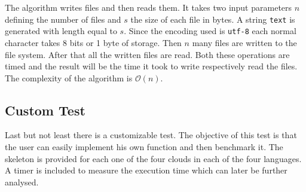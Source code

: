 The algorithm writes files and then reads them. It takes two input parameters $n$ defining the number of files and $s$ the size of each file in bytes. A string \texttt{text} is generated with length equal to $s$. Since the encoding used is \texttt{utf-8} each normal character takes 8 bits or 1 byte of storage. Then $n$ many files are written to the file system. After that all the written files are read. Both these operations are timed and the result will be the time it took to write respectively read the files. The complexity of the algorithm is $\mathcal{O}(n)$.

\subsection{Custom Test}
Last but not least there is a customizable test. The objective of this test is that the user can easily implement his own function and then benchmark it. The skeleton is provided for each one of the four clouds in each of the four languages. A timer is included to measure the execution time which can later be further analysed.